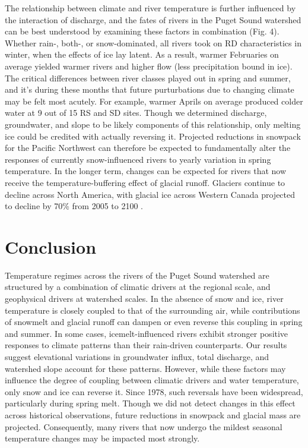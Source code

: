 \documentclass[notitlepage]{article}
\begin{document}
The relationship between climate and river temperature is further influenced by the interaction of discharge, and the fates of rivers in the Puget Sound watershed can be best understood by examining these factors in combination (Fig. 4). Whether rain-, both-, or snow-dominated, all rivers took on RD characteristics in winter, when the effects of ice lay latent. As a result, warmer Februaries on average yielded warmer rivers and higher flow (less precipitation bound in ice). The critical differences between river classes played out in spring and summer, and it's during these months that future purturbations due to changing climate may be felt most acutely. For example, warmer Aprils on average produced colder water at 9 out of 15 RS and SD sites. Though we determined discharge, groundwater, and slope to be likely components of this relationship, only melting ice could be credited with actually reversing it. Projected reductions in snowpack for the Pacific Northwest can therefore be expected to fundamentally alter the responses of currently snow-influenced rivers to yearly variation in spring temperature. In the longer term, changes can be expected for rivers that now receive the temperature-buffering effect of glacial runoff. Glaciers continue to decline across North America, with glacial ice across Western Canada projected to decline by 70\% from 2005 to 2100 \citep{clarke2015projected}.

\section*{Conclusion}

Temperature regimes across the rivers of the Puget Sound watershed are structured by a combination of climatic drivers at the regional scale, and geophysical drivers at watershed scales. In the absence of snow and ice, river temperature is closely coupled to that of the surrounding air, while contributions of snowmelt and glacial runoff can dampen or even reverse this coupling in spring and summer. In some cases, icemelt-influenced rivers exhibit stronger positive responses to climate patterns than their rain-driven counterparts. Our results suggest elevational variations in groundwater influx, total discharge, and watershed slope account for these patterns. However, while these factors may influence the degree of coupling between climatic drivers and water temperature, only snow and ice can reverse it. Since 1978, such reversals have been widespread, particularly during spring melt. Though we did not detect changes in this effect across historical observations, future reductions in snowpack and glacial mass are projected. Consequently, many rivers that now undergo the mildest seasonal temperature changes may be impacted most strongly.
\clearpage
\end{document}
